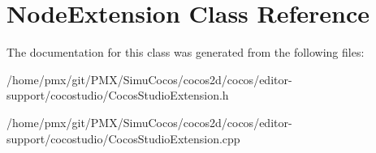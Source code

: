 \hypertarget{classNodeExtension}{}\section{Node\+Extension Class Reference}
\label{classNodeExtension}


The documentation for this class was generated from the following files\+:\begin{DoxyCompactItemize}
\item 
/home/pmx/git/\+P\+M\+X/\+Simu\+Cocos/cocos2d/cocos/editor-\/support/cocostudio/Cocos\+Studio\+Extension.\+h\item 
/home/pmx/git/\+P\+M\+X/\+Simu\+Cocos/cocos2d/cocos/editor-\/support/cocostudio/Cocos\+Studio\+Extension.\+cpp\end{DoxyCompactItemize}
